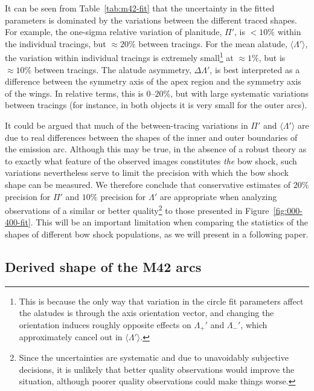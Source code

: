 \documentclass[useAMS, usenatbib, a4paper]{mnras}
\begin{document}
It can be seen from Table~\ref{tab:m42-fit} that the uncertainty in
the fitted parameters is dominated by the variations between the
different traced shapes.  For example, the one-sigma relative
variation of planitude, \(\Pi'\), is \(< 10\%\) within the individual
tracings, but \(\approx 20\%\) between tracings.  For the mean alatude,
\(\langle\Lambda'\rangle\), the variation within individual tracings is extremely
small\footnote{%
  This is because the only way that variation in the circle fit
  parameters affect the alatudes is through the axis orientation
  vector, and changing the orientation induces roughly opposite
  effects on \(\Lambda_+'\) and \(\Lambda_-'\), which approximately cancel out in
  \(\langle\Lambda'\rangle\).  } %
at \(\approx 1\%\), but is \(\approx 10\%\) between tracings.  The alatude
asymmetry, \(\Delta\Lambda'\), is best interpreted as a difference between the
symmetry axis of the apex region and the symmetry axis of the wings.
In relative terms, this is \(0\)--\(20\%\), but with large systematic
variations between tracings (for instance, in both objects it is very
small for the outer arcs).

It could be argued that much of the between-tracing variations in
\(\Pi'\) and \(\langle\Lambda'\rangle\) are due to real differences between the shapes of
the inner and outer boundaries of the emission arc.  Although this may
be true, in the absence of a robust theory as to exactly what feature
of the observed images constitutes \emph{the} bow shock, such
variations nevertheless serve to limit the precision with which the
bow shock shape can be measured.  We therefore conclude that
conservative estimates of \(20\%\) precision for \(\Pi'\) and \(10\%\)
precision for \(\Lambda'\) are appropriate when analyzing observations of a
similar or better quality\footnote{%
  Since the uncertainties are systematic and due to unavoidably
  subjective decisions, it is unlikely that better quality
  observations would improve the situation, although poorer quality
  observations could make things worse.  } %
to those presented in Figure~\ref{fig:000-400-fit}.  This will be an
important limitation when comparing the statistics of the shapes of
different bow shock populations, as we will present in a following
paper.

\subsection{Derived shape of the M42 arcs}
\label{sec:derived-shape-m42}
\end{document}
